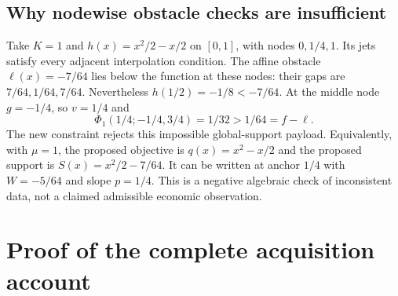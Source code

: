 \subsection{Why nodewise obstacle checks are insufficient}

Take $K=1$ and $h(x)=x^2/2-x/2$ on $[0,1]$, with nodes
$0,1/4,1$. Its jets satisfy every adjacent interpolation condition.
The affine obstacle $\ell(x)=-7/64$ lies below the function at
these nodes: their gaps are $7/64,1/64,7/64$. Nevertheless
$h(1/2)=-1/8<-7/64$. At the middle node $g=-1/4$, so
$v=1/4$ and
\[
 \Phi_1(1/4;-1/4,3/4)=1/32>1/64=f-\ell.
\]
The new constraint rejects this impossible global-support payload.
Equivalently, with $\mu=1$, the proposed objective is
$q(x)=x^2-x/2$ and the proposed support is
$S(x)=x^2/2-7/64$. It can be written at anchor $1/4$ with
$W=-5/64$ and slope $p=1/4$. This is a negative algebraic check
of inconsistent data, not a claimed admissible economic observation.

\section{Proof of the complete acquisition account}
\label{supp:paidresolution125}

